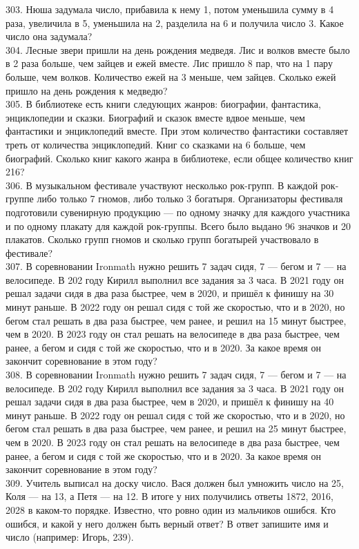 \documentclass[12pt]{article}
\begin{document}
303. Нюша задумала число, прибавила к нему 1, потом уменьшила сумму в 4 раза, увеличила в 5, уменьшила на 2, разделила на 6 и получила число 3. Какое число она задумала?\\
304. Лесные звери пришли на день рождения медведя. Лис и волков вместе было в 2 раза больше, чем зайцев и ежей вместе. Лис пришло 8 пар, что на 1 пару больше, чем волков. Количество ежей на 3 меньше, чем зайцев. Сколько ежей пришло на день рождения к медведю?\\
305. В библиотеке есть книги следующих жанров: биографии, фантастика, энциклопедии и сказки. Биографий и сказок вместе вдвое меньше, чем фантастики и энциклопедий вместе. При этом количество фантастики составляет треть от количества энциклопедий. Книг со сказками на 6 больше, чем биографий. Сколько книг какого жанра в библиотеке, если общее количество книг 216?\\
306. В музыкальном фестивале участвуют несколько рок-групп. В каждой рок-группе либо только 7 гномов, либо только 3 богатыря. Организаторы фестиваля подготовили сувенирную продукцию --- по одному значку для каждого участника и по одному плакату для каждой рок-группы. Всего было выдано 96 значков и 20 плакатов. Сколько групп гномов и сколько групп богатырей участвовало в фестивале?\\
307. В соревновании Ironmath нужно решить 7 задач сидя, 7 --- бегом и 7 --- на велосипеде. В 202 году Кирилл выполнил все задания за 3 часа. В 2021 году он решал задачи сидя в два раза быстрее, чем в 2020, и пришёл к финишу на 30 минут раньше. В 2022 году он решал сидя с той же скоростью, что и в 2020, но бегом стал решать в два раза быстрее, чем ранее, и решил на 15 минут быстрее, чем в 2020. В 2023 году он стал решать на велосипеде в два раза быстрее, чем ранее, а бегом и сидя с той же скоростью, что и в 2020. За какое время он закончит соревнование в этом году?\\
308. В соревновании Ironmath нужно решить 7 задач сидя, 7 --- бегом и 7 --- на велосипеде. В 202 году Кирилл выполнил все задания за 3 часа. В 2021 году он решал задачи сидя в два раза быстрее, чем в 2020, и пришёл к финишу на 40 минут раньше. В 2022 году он решал сидя с той же скоростью, что и в 2020, но бегом стал решать в два раза быстрее, чем ранее, и решил на 25 минут быстрее, чем в 2020. В 2023 году он стал решать на велосипеде в два раза быстрее, чем ранее, а бегом и сидя с той же скоростью, что и в 2020. За какое время он закончит соревнование в этом году?\\
309. Учитель выписал на доску число. Вася должен был умножить число на 25, Коля --- на 13, а Петя --- на 12. В итоге у них получились ответы 1872, 2016, 2028 в каком-то порядке. Известно, что ровно один из мальчиков ошибся. Кто ошибся, и какой у него должен быть верный ответ? В ответ запишите имя и число (например: Игорь, 239).\\
\end{document}
